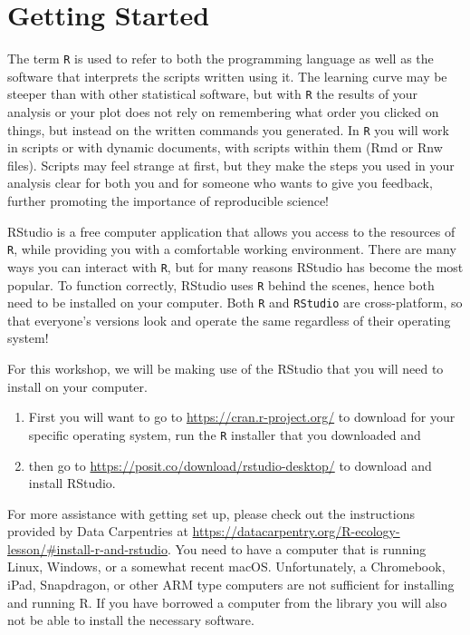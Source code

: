 \documentclass[
  10pt,
  letterpaper,
  twoside,
  openright]{book}
\providecommand{\tightlist}{%
  \setlength{\itemsep}{0pt}\setlength{\parskip}{0pt}}
\begin{document}
\hypertarget{getting-started}{%
\section{Getting Started}\label{getting-started}}

The term \texttt{R} is used to refer to both the programming language as
well as the software that interprets the scripts written using it. The
learning curve may be steeper than with other statistical software, but
with \texttt{R} the results of your analysis or your plot does not rely
on remembering what order you clicked on things, but instead on the
written commands you generated. In \texttt{R} you will work in scripts
or with dynamic documents, with scripts within them (Rmd or Rnw files).
Scripts may feel strange at first, but they make the steps you used in
your analysis clear for both you and for someone who wants to give you
feedback, further promoting the importance of reproducible science!

RStudio is a free computer application that allows you access to the
resources of \texttt{R}, while providing you with a comfortable working
environment. There are many ways you can interact with \texttt{R}, but
for many reasons RStudio has become the most popular. To function
correctly, RStudio uses \texttt{R} behind the scenes, hence both need to
be installed on your computer. Both \texttt{R} and \texttt{RStudio} are
cross-platform, so that everyone's versions look and operate the same
regardless of their operating system!

For this workshop, we will be making use of the RStudio that you will
need to install on your computer.

\begin{enumerate}
\def\labelenumi{\arabic{enumi}.}
\tightlist
\item
  First you will want to go to \url{https://cran.r-project.org/} to
  download for your specific operating system, run the \texttt{R}
  installer that you downloaded and\\
\item
  then go to \url{https://posit.co/download/rstudio-desktop/} to
  download and install RStudio.
\end{enumerate}

For more assistance with getting set up, please check out the
instructions provided by Data Carpentries at
\url{https://datacarpentry.org/R-ecology-lesson/\#install-r-and-rstudio}.
You need to have a computer that is running Linux, Windows, or a
somewhat recent macOS. Unfortunately, a Chromebook, iPad, Snapdragon, or
other ARM type computers are not sufficient for installing and running
R. If you have borrowed a computer from the library you will also not be
able to install the necessary software.
\end{document}
